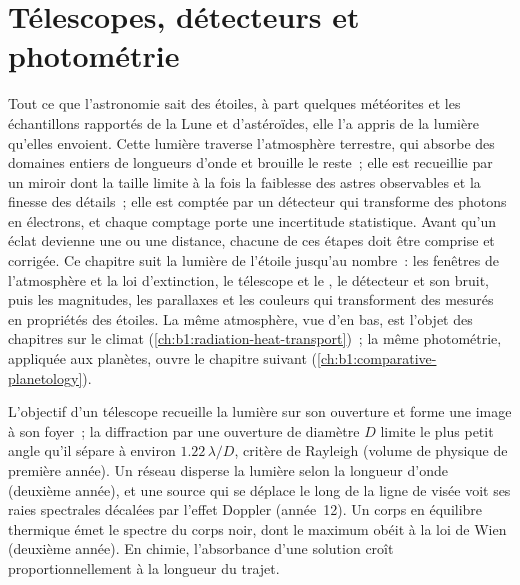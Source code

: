 \chapter{Télescopes, détecteurs et photométrie}\label{ch:b1:observing-the-sky}

Tout ce que l'astronomie sait des étoiles, à part quelques météorites et les
échantillons rapportés de la Lune et d'astéroïdes, elle l'a appris de la
lumière qu'elles envoient. Cette lumière traverse l'atmosphère terrestre, qui
absorbe des domaines entiers de longueurs d'onde et brouille le reste~; elle
est recueillie par un miroir dont la taille limite à la fois la faiblesse des
astres observables et la finesse des détails~; elle est comptée par un
détecteur qui transforme des photons en électrons, et chaque comptage porte une
incertitude statistique. Avant qu'un éclat devienne une  ou une
distance, chacune de ces étapes doit être comprise et corrigée. Ce chapitre
suit la lumière de l'étoile jusqu'au nombre~: les fenêtres de l'atmosphère et
la loi d'extinction, le télescope et le , le détecteur et son bruit, puis
les magnitudes, les parallaxes et les couleurs qui transforment des 
mesurés en propriétés des étoiles. La même atmosphère, vue d'en bas, est
l'objet des chapitres sur le climat (\cref{ch:b1:radiation-heat-transport})~;
la même photométrie, appliquée aux planètes, ouvre le chapitre suivant
(\cref{ch:b1:comparative-planetology}).

\begin{recall}
L'objectif d'un télescope recueille la lumière sur son ouverture et forme une
image à son foyer~; la diffraction par une ouverture de diamètre $D$ limite le
plus petit angle qu'il sépare à environ $1.22\,\lambda/D$, critère de Rayleigh
(volume de physique de première année). Un réseau disperse la lumière selon la
longueur d'onde (deuxième année), et une source qui se déplace le long de la
ligne de visée voit ses raies spectrales décalées par l'effet Doppler
(année~12). Un corps en équilibre thermique émet le spectre du corps noir, dont
le maximum obéit à la loi de Wien (deuxième année). En chimie, l'absorbance
d'une solution croît proportionnellement à la longueur du trajet.
\end{recall}

